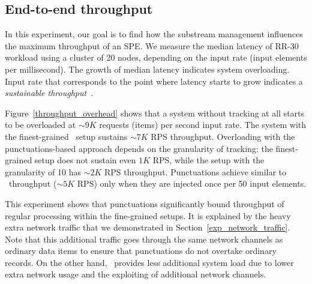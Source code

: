 
\subsection{End-to-end throughput}
In this experiment, our goal is to find how the substream management influences the maximum throughput of an SPE. We measure the median latency of RR-30 workload using a cluster of 20 nodes, depending on the input rate (input elements per millisecond). The growth of median latency indicates system overloading. Input rate that corresponds to the point where latency starts to grow indicates a {\em sustainable throughput}~\cite{karimov2018benchmarking}.

Figure~\ref{throughput_overhead} shows that a system without tracking at all starts to be overloaded at $\sim 9K$ requests (items) per second input rate. The system with the finest-grained \tracker\ setup sustains $\sim 7K$ RPS throughput. Overloading with the punctuations-based approach depends on the granularity of tracking: the finest-grained setup does not sustain even $1K$ RPS, while the setup with the granularity of 10 has $\sim 2K$ RPS throughput. Punctuations achieve similar to \tracker\ throughput ($\sim 5K$ RPS) only when they are injected once per 50 input elements.

This experiment shows that punctuations significantly bound throughput of regular processing within the fine-grained setups. It is explained by the heavy extra network traffic that we demonstrated in Section~\ref{exp_network_traffic}. Note that this additional traffic goes through the same network channels as ordinary data items to ensure that punctuations do not overtake ordinary records. On the other hand, \tracker\ provides less additional system load due to lower extra network usage and the exploiting of additional network channels.


